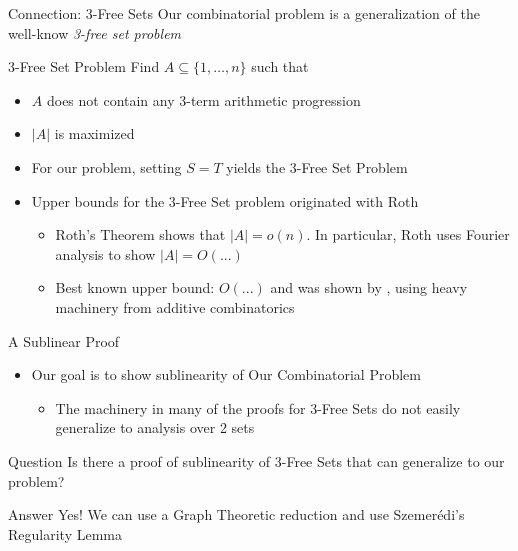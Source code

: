 \begin{frame}{Connection: 3-Free Sets}
Our combinatorial problem is a generalization of the well-know \textit{3-free set problem}

\begin{block}{3-Free Set Problem}
	Find $A \subseteq \{1,\dotsc,n\}$ such that
	\begin{itemize}
		\item $A$ does not contain any 3-term arithmetic progression
		\item $|A|$ is maximized
	\end{itemize}
\end{block}
\begin{itemize}
	\item For our problem, setting $S = T$ yields the 3-Free Set Problem
	\item Upper bounds for the 3-Free Set problem originated with Roth \cite{}
	\begin{itemize}
		\item Roth's Theorem shows that $|A| = o(n)$. In particular, Roth uses Fourier analysis to show $|A| = O(...)$
		\item Best known upper bound: $O(...)$ and was shown by \cite{..}, using heavy machinery from additive combinatorics
	\end{itemize}
\end{itemize}
\end{frame}

\begin{frame}{A Sublinear Proof}

\begin{itemize}
	\item Our goal is to show sublinearity of Our Combinatorial Problem
	\begin{itemize}
		\item The machinery in many of the proofs for 3-Free Sets do not easily generalize to analysis over 2 sets 
	\end{itemize}
\end{itemize}

\begin{block}{Question}
	Is there a proof of sublinearity of 3-Free Sets that can generalize to our problem?
\end{block}

\begin{block}{Answer}
	Yes! We can use a Graph Theoretic reduction and use Szemer\'{e}di's Regularity Lemma
\end{block}

\end{frame}


